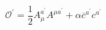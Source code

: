 \begin{equation}
\mathcal{O}^{\prime }=\frac{1}{2}A_{\mu }^{a^{\prime }}A^{\mu a^{\prime
}}+\alpha \overline{c}^{a^{\prime }}c^{a^{\prime }}  \label{dudal31}
\end{equation}

